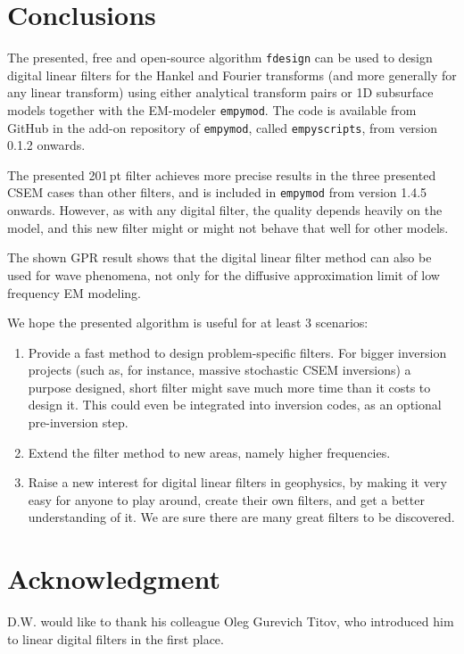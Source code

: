 \documentclass[paper,twocolumn,twoside]{geophysics}
\begin{document}
\section{Conclusions}

The presented, free and open-source algorithm \texttt{fdesign} can be used to
design digital linear filters for the Hankel and Fourier transforms (and more
generally for any linear transform) using either analytical transform pairs or
1D subsurface models together with the EM-modeler \texttt{empymod}.
The code is available from GitHub in the add-on repository of \texttt{empymod},
called \texttt{empyscripts}, from version 0.1.2 onwards.

The presented 201\,pt filter achieves more precise results in the three
presented CSEM cases than other filters, and is included in \texttt{empymod}
from version 1.4.5 onwards. However, as with any digital filter, the quality
depends heavily on the model, and this new filter might or might not behave
that well for other models.

The shown GPR result shows that the digital linear filter method can also be
used for wave phenomena, not only for the diffusive approximation limit of low
frequency EM modeling.

We hope the presented algorithm is useful for at least 3 scenarios:
\begin{enumerate}
  \item Provide a fast method to design problem-specific filters. For bigger
    inversion projects (such as, for instance, massive stochastic CSEM
    inversions) a purpose designed, short filter might save much more time than
    it costs to design it. This could even be integrated into inversion codes,
    as an optional pre-inversion step.
  \item Extend the filter method to new areas, namely higher frequencies.
  \item Raise a new interest for digital linear filters in geophysics, by
    making it very easy for anyone to play around, create their own filters,
    and get a better understanding of it. We are sure there are many great
    filters to be discovered.
\end{enumerate}

\section{Acknowledgment}
D.W. would like to thank his colleague Oleg Gurevich Titov, who introduced him
to linear digital filters in the first place.



\end{document}
